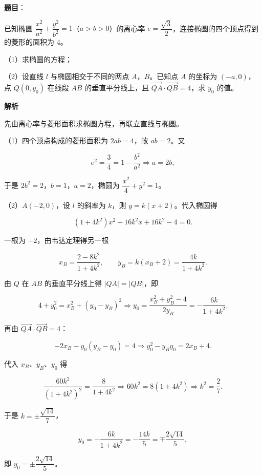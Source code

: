 \begin{answer}

\textbf{题目}：

已知椭圆 $\dfrac{x^2}{a^2}+\dfrac{y^2}{b^2}=1$（$a>b>0$）的离心率 $e=\dfrac{\sqrt3}2$，连接椭圆的四个顶点得到的菱形的面积为 $4$。

（1）求椭圆的方程；

（2）设直线 $l$ 与椭圆相交于不同的两点 $A$，$B$。已知点 $A$ 的坐标为 $(-a,0)$，点 $Q(0,y_0)$ 在线段 $AB$ 的垂直平分线上，且 $\overrightarrow{QA}\cdot\overrightarrow{QB}=4$，求 $y_0$ 的值。

\textbf{解析}

先由离心率与菱形面积求椭圆方程，再联立直线与椭圆。

（1）四个顶点构成的菱形面积为 $2ab=4$，故 $ab=2$。又

\nopagebreak[4]
\[e^2=\frac34=1-\frac{b^2}{a^2}\Longrightarrow a=2b,\]

于是 $2b^2=2$，$b=1$，$a=2$，椭圆为 $\dfrac{x^2}4+y^2=1$。

（2）$A(-2,0)$，设 $l$ 的斜率为 $k$，则 $y=k(x+2)$。代入椭圆得

\nopagebreak[4]
\[(1+4k^2)x^2+16k^2x+16k^2-4=0.\]

一根为 $-2$，由韦达定理得另一根

\nopagebreak[4]
\[x_B=\frac{2-8k^2}{1+4k^2},\qquad
y_B=k(x_B+2)=\frac{4k}{1+4k^2}.\]

由 $Q$ 在 $AB$ 的垂直平分线上得 $|QA|=|QB|$，即

\nopagebreak[4]
\[4+y_0^2=x_B^2+(y_0-y_B)^2
\Longrightarrow y_0=\frac{x_B^2+y_B^2-4}{2y_B}
=-\frac{6k}{1+4k^2}.\]

再由 $\overrightarrow{QA}\cdot\overrightarrow{QB}=4$：

\nopagebreak[4]
\[-2x_B-y_0(y_B-y_0)=4
\Longrightarrow y_0^2-y_By_0=2x_B+4.\]

代入 $x_B$、$y_B$、$y_0$ 得

\nopagebreak[4]
\[\frac{60k^2}{(1+4k^2)^2}=\frac8{1+4k^2}
\Longrightarrow 60k^2=8(1+4k^2)
\Longrightarrow k^2=\frac27.\]

于是 $k=\pm\dfrac{\sqrt{14}}7$，

\nopagebreak[4]
\[y_0=-\frac{6k}{1+4k^2}=-\frac{14k}5=\mp\frac{2\sqrt{14}}5,\]

即 $y_0=\pm\dfrac{2\sqrt{14}}5$。


\end{answer}
